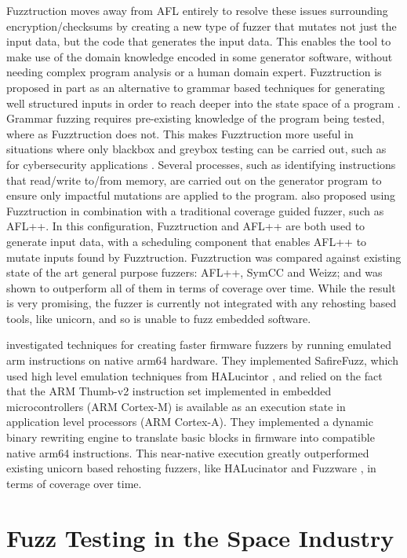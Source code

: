 \documentclass[../report.tex]{subfiles}
\begin{document}
Fuzztruction \citep{Fuzztruction_2023} moves away from AFL entirely to resolve
these issues surrounding encryption/checksums by creating a new type of fuzzer
that mutates not just the input data, but the code that generates the input
data. This enables the tool to make use of the domain knowledge encoded in some
generator software, without needing complex program analysis or a human domain
expert. Fuzztruction is proposed in part as an alternative to grammar based
techniques for generating well structured inputs in order to reach deeper into
the state space of a program \citep{Fuzztruction_2023}. Grammar fuzzing
requires pre-existing knowledge of the program being tested, where as
Fuzztruction does not. This makes Fuzztruction more useful in situations where
only blackbox and greybox testing can be carried out, such as for cybersecurity
applications \citep{Fuzztruction_2023}. Several processes, such as identifying
instructions that read/write to/from memory, are carried out on the generator
program to ensure only impactful mutations are applied to the program.
\citet{Fuzztruction_2023} also proposed using Fuzztruction in combination with
a traditional coverage guided fuzzer, such as AFL++. In this configuration,
Fuzztruction and AFL++ are both used to generate input data, with a scheduling
component that enables AFL++ to mutate inputs found by Fuzztruction.
Fuzztruction was compared against existing state of the art general purpose
fuzzers: AFL++, SymCC and Weizz; and was shown to outperform all of them in
terms of coverage over time. While the result is very promising, the fuzzer is
currently not integrated with any rehosting based tools, like unicorn, and so
is unable to fuzz embedded software.

\citet{Seidel_2023} investigated techniques for creating faster firmware
fuzzers by running emulated arm instructions on native arm64 hardware. They
implemented SafireFuzz, which used high level emulation techniques from
HALucintor \citep{HALucinator_2020}, and relied on the fact that the ARM
Thumb-v2 instruction set implemented in embedded microcontrollers (ARM
Cortex-M) is available as an execution state in application level processors
(ARM Cortex-A). They implemented a dynamic binary rewriting engine to translate
basic blocks in firmware into compatible native arm64 instructions. This
near-native execution greatly outperformed existing unicorn based rehosting
fuzzers, like HALucinator \citep{HALucinator_2020} and Fuzzware
\citep{Fuzzware_2022}, in terms of coverage over time.

\section{Fuzz Testing in the Space Industry}
\end{document}
